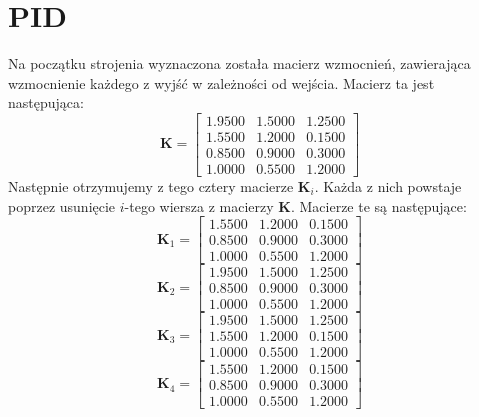 \chapter{PID}
Na początku strojenia wyznaczona została macierz wzmocnień, zawierająca
wzmocnienie każdego z wyjść w zależności od wejścia. Macierz ta jest następująca:
\begin{equation}
  \bm{K} =
  \begin{bmatrix}
    1.9500  &  1.5000  &  1.2500 \\
    1.5500  &  1.2000  &  0.1500 \\
    0.8500  &  0.9000  &  0.3000 \\
    1.0000 &   0.5500  &  1.2000
  \end{bmatrix}
\end{equation}
Następnie otrzymujemy z tego cztery macierze $\bm{K}_i$. Każda z nich powstaje poprzez
usunięcie $i$-tego wiersza z macierzy $\bm{K}$. Macierze te są następujące:
\begin{equation}
  \bm{K}_1 =
  \begin{bmatrix}
    1.5500   & 1.2000 &   0.1500 \\
        0.8500   & 0.9000 &   0.3000 \\
        1.0000   & 0.5500  &  1.2000
  \end{bmatrix}
\end{equation}
\begin{equation}
  \bm{K}_2 =
  \begin{bmatrix}
    1.9500 &   1.5000 &   1.2500 \\
       0.8500   & 0.9000 &   0.3000 \\
       1.0000   & 0.5500 &   1.2000
  \end{bmatrix}
\end{equation}
\begin{equation}
  \bm{K}_3 =
  \begin{bmatrix}
    1.9500 &   1.5000 &   1.2500 \\
       1.5500   & 1.2000 &   0.1500 \\
       1.0000   & 0.5500  &  1.2000
  \end{bmatrix}
\end{equation}
\begin{equation}
  \bm{K}_4 =
  \begin{bmatrix}
    1.5500 &   1.2000 &   0.1500 \\
       0.8500   & 0.9000 &   0.3000 \\
       1.0000   & 0.5500  &  1.2000
  \end{bmatrix}
\end{equation}
